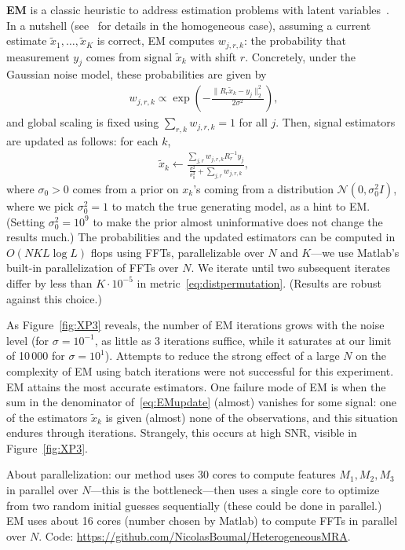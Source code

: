 \documentclass[english]{article}
\numberwithin{equation}{section}
\numberwithin{figure}{section}
\theoremstyle{plain}
\theoremstyle{definition}
\theoremstyle{remark}
\theoremstyle{plain}
\theoremstyle{remark}
\theoremstyle{plain}
\theoremstyle{plain}
\begin{document}
\textbf{EM} is a classic heuristic to address estimation problems with latent variables~\cite{dempster1977maximum}. In a nutshell (see~\cite{bendory2017bispectrum} for details in the homogeneous case), assuming a current estimate $\tilde x_1, \ldots, \tilde x_K$ is correct, EM computes $w_{j,r,k}$: the probability that measurement $y_j$ comes from signal $\tilde x_k$ with shift $r$. Concretely, under the Gaussian noise model, these probabilities are given by 
\begin{align}
	w_{j,r,k} \propto \exp\left( -\frac{\|R_r \tilde x_k - y_j\|_2^2}{2\sigma^2} \right),
\end{align}
and global scaling is fixed using $\sum_{r,k} w_{j,r,k} = 1$ for all $j$. Then, signal estimators are updated as follows: for each $k$,
\begin{align}
	\tilde x_k \leftarrow \frac{\sum_{j, r}w_{j,r,k} R_r^{-1} y_j}{\frac{\sigma^2}{\sigma_0^2} + \sum_{j, r}w_{j,r,k}},
	\label{eq:EMupdate}
\end{align}
where $\sigma_0 > 0$ comes from a prior on $x_k$'s coming from a distribution $\mathcal{N}(0, \sigma_0^2 I)$, where we pick $\sigma_0^2 = 1$ to match the true generating model, as a hint to EM. (Setting $\sigma_0^2 = 10^9$ to make the prior almost uninformative does not change the results much.)
The probabilities and the updated estimators can be computed in $O(NKL\log L)$ flops using FFTs, parallelizable over $N$ and $K$---we use Matlab's built-in parallelization of FFTs over $N$. We iterate until two subsequent iterates differ by less than $K \cdot 10^{-5}$ in metric~\eqref{eq:distpermutation}. (Results are robust against this choice.)

As Figure~\ref{fig:XP3} reveals, the number of EM iterations grows with the noise level (for $\sigma = 10^{-1}$, as little as 3 iterations suffice, while it saturates at our limit of 10\,000 for $\sigma = 10^1$). Attempts to reduce the strong effect of a large $N$ on the complexity of EM using batch iterations were not successful for this experiment. EM attains the most accurate estimators. One failure mode of EM is when the sum in the denominator of~\eqref{eq:EMupdate} (almost) vanishes for some signal: one of the estimators $\tilde x_k$ is given (almost) none of the observations, and this situation endures through iterations. Strangely, this occurs at high SNR, visible in Figure~\ref{fig:XP3}.

About parallelization: our method uses 30 cores to compute features $M_1, M_2, M_3$ in parallel over $N$---this is the bottleneck---then uses a single core to optimize from two random initial guesses sequentially (these could be done in parallel.) EM uses about 16 cores (number chosen by Matlab) to compute FFTs in parallel over $N$.
%
{Code: \scriptsize{\url{https://github.com/NicolasBoumal/HeterogeneousMRA}.}}
\end{document}
